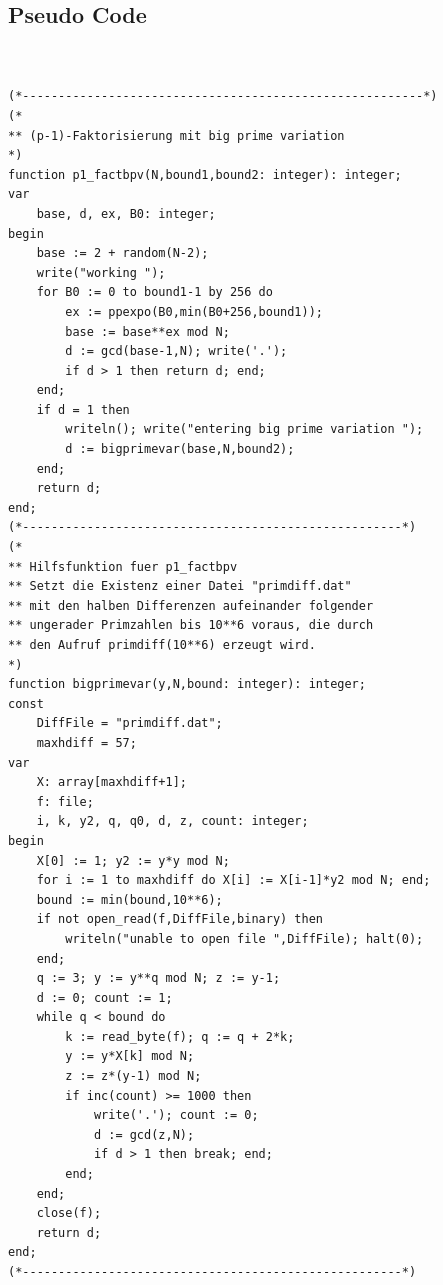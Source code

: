 \documentclass[a4paper,11pt]{article}
\begin{document}
\subsection{Pseudo Code}
\begin{verbatim}


(*--------------------------------------------------------*)
(*
** (p-1)-Faktorisierung mit big prime variation
*)
function p1_factbpv(N,bound1,bound2: integer): integer;
var
    base, d, ex, B0: integer;
begin
    base := 2 + random(N-2);
    write("working ");
    for B0 := 0 to bound1-1 by 256 do
        ex := ppexpo(B0,min(B0+256,bound1));
        base := base**ex mod N;
        d := gcd(base-1,N); write('.');
        if d > 1 then return d; end;
    end;
    if d = 1 then
        writeln(); write("entering big prime variation ");
        d := bigprimevar(base,N,bound2);
    end;
    return d;
end;
(*-----------------------------------------------------*)
(*
** Hilfsfunktion fuer p1_factbpv
** Setzt die Existenz einer Datei "primdiff.dat"
** mit den halben Differenzen aufeinander folgender
** ungerader Primzahlen bis 10**6 voraus, die durch
** den Aufruf primdiff(10**6) erzeugt wird.
*)
function bigprimevar(y,N,bound: integer): integer;
const
    DiffFile = "primdiff.dat";
    maxhdiff = 57;
var
    X: array[maxhdiff+1];
    f: file;
    i, k, y2, q, q0, d, z, count: integer;
begin
    X[0] := 1; y2 := y*y mod N;
    for i := 1 to maxhdiff do X[i] := X[i-1]*y2 mod N; end;
    bound := min(bound,10**6);
    if not open_read(f,DiffFile,binary) then
        writeln("unable to open file ",DiffFile); halt(0);
    end;
    q := 3; y := y**q mod N; z := y-1;
    d := 0; count := 1;
    while q < bound do
        k := read_byte(f); q := q + 2*k;
        y := y*X[k] mod N;
        z := z*(y-1) mod N;
        if inc(count) >= 1000 then
            write('.'); count := 0;
            d := gcd(z,N);
            if d > 1 then break; end;
        end;
    end;
    close(f);
    return d;
end;
(*-----------------------------------------------------*)



\end{verbatim}
\end{document}

